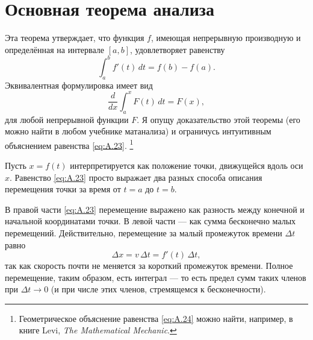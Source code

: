 \section{Основная теорема анализа}\label{Основная теорема анализа}

Эта теорема утверждает, что функция $f$, имеющая непрерывную производную и определённая на интервале $[a,b]$, удовлетворяет равенству
\begin{equation}
\int_a^b f'(t)\,dt = f(b) - f(a).
\label{eq:A.23}
\end{equation}
Эквивалентная формулировка имеет вид
\begin{equation}
\frac{d}{dx} \int_a^x F(t)\,dt = F(x),
\label{eq:A.24}
\end{equation}
для любой непрерывной функции $F$.
Я опущу доказательство этой теоремы (его можно найти в любом учебнике матанализа) и ограничусь интуитивным объяснением равенства \eqref{eq:A.23}.%
\footnote{Геометрическое объяснение равенства \eqref{eq:A.24} можно найти, например, в книге Levi, \emph{The Mathematical Mechanic}.}

Пусть $x = f(t)$ интерпретируется как положение точки, движущейся вдоль оси $x$.
Равенство \eqref{eq:A.23} просто выражает два разных способа описания перемещения точки за время от $t=a$ до $t=b$.

В правой части \eqref{eq:A.23} перемещение выражено как разность между конечной и начальной координатами точки.
В левой части — как сумма бесконечно малых перемещений.
Действительно, перемещение за малый промежуток времени $\Delta t$ равно
\[\Delta x = v\,\Delta t = f'(t)\,\Delta t,\]
так как скорость почти не меняется за короткий промежуток времени.
Полное перемещение, таким образом, есть интеграл — то есть предел сумм таких членов при $\Delta t\to0$ (и при числе этих членов, стремящемся к бесконечности).
